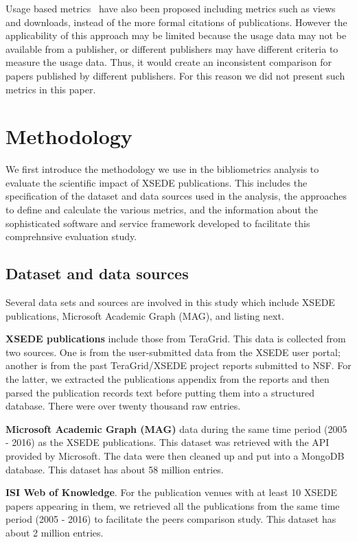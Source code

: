 \documentclass{sig-alternate}
\begin{document}
Usage based
metrics~\cite{Bollen:2007:MUM:1255175.1255273,Bollen:2008:TUI:1378889.1378928}
have also been proposed including metrics such as views and downloads,
instead of the more formal citations of publications. However the
applicability of this approach may be limited because the usage data
may not be available from a publisher, or different publishers may
have different criteria to measure the usage data. Thus, it would
create an inconsistent comparison for papers published by different
publishers.  For this reason we did not present such metrics in this
paper.

\section{Methodology} \label{S:methodology}

We first introduce the methodology we use in the bibliometrics
analysis to evaluate the scientific impact of XSEDE publications. This
includes the specification of the dataset and data sources used in the
analysis, the approaches to define and calculate the various metrics,
and the information about the sophisticated software and service
framework developed to facilitate this comprehnsive evaluation study.

\subsection{Dataset and data sources}

Several data sets and sources are involved in this study which include
XSEDE publications,  Microsoft Academic Graph (MAG), and 
listing next.

\parindent 0pt \textbf{XSEDE publications} include those from
TeraGrid. This data is collected from two sources. One is from the
user-submitted data from the XSEDE user portal; another is from the
past TeraGrid/XSEDE project reports submitted to NSF. For the latter,
we extracted the publications appendix from the reports and then
parsed the publication records text before putting them into a
structured database. There were over twenty thousand raw entries.

\parindent 0pt \textbf{Microsoft Academic Graph (MAG)} data during the
same time period (2005 - 2016) as the XSEDE publications. This dataset
was retrieved with the API provided by Microsoft. The data were then
cleaned up and put into a MongoDB database. This dataset has about 58
million entries.

\parindent 0pt \textbf{ISI Web of Knowledge}. For the publication
venues with at least 10 XSEDE papers appearing in them, we retrieved
all the publications from the same time period (2005 - 2016) to
facilitate the peers comparison study. This dataset has about 2
million entries.
\end{document}
